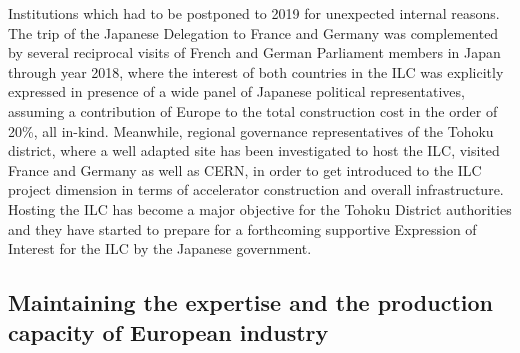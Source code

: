 \documentclass[%
 reprint,
 floatfix,
 amsmath,amssymb,
 aps,
]{revtex4-1}
\begin{document}
Institutions which had to be postponed to 2019 for unexpected internal reasons.
The trip of the Japanese Delegation to France and Germany was complemented by several reciprocal
visits of French and German Parliament members in Japan through year 2018, where the interest of
both countries in the ILC was explicitly expressed in presence of a wide panel of Japanese political
representatives, assuming a contribution of Europe to the total construction cost in the order of 20\%,
all in-kind. Meanwhile, regional governance representatives of the Tohoku district, where a well adapted
site has been investigated to host the ILC, visited France and Germany as well as CERN, in order to get
introduced to the ILC project dimension in terms of accelerator construction and overall infrastructure.
Hosting the ILC has become a major objective for the Tohoku District authorities and they have started
to prepare for a forthcoming supportive Expression of Interest for the ILC by the Japanese government.





\subsection{\label{sec:discussionInd}Maintaining the expertise and the production capacity of European industry}
\end{document}
